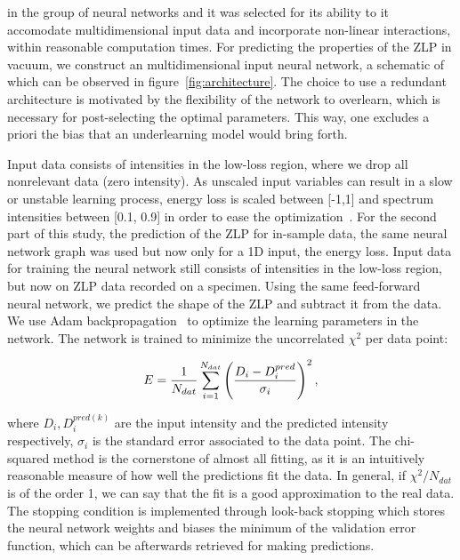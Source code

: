 %
%
in the group of neural networks and it was selected for its ability
to it accomodate multidimensional input data and 
incorporate non-linear interactions, within reasonable computation times. 
%
For predicting the properties of the ZLP in vacuum, we construct an multidimensional
input neural network, a schematic of which can be observed in figure~\ref{fig:architecture}.
%
The choice to use a redundant architecture is motivated by the flexibility of the network 
to overlearn, which is necessary for post-selecting the optimal parameters.
This way, one excludes a priori the bias that an underlearning model would bring forth. 



%
Input data consists of intensities in the low-loss region, 
where we drop all nonrelevant data (zero intensity). As unscaled input variables
can result in a slow or unstable learning process,
energy loss is scaled between [-1,1] and spectrum intensities between [0.1, 0.9]
in order to ease the optimization~\cite{Ball:2008by}.
%
For the second part of this study, the prediction of the ZLP for in-sample data,
the same neural network graph was used but now only for a 1D input, the energy loss. 
%
Input data for training the neural network still consists of intensities in the low-loss region, 
but now on ZLP data recorded on a specimen. Using the same feed-forward neural network,
we predict the shape of the ZLP and subtract it from the data.
%
We use Adam backpropagation~\cite{Kingma:2017} to optimize the learning parameters in the network. 
The network is trained to minimize the uncorrelated $\chi^2$ per data point:

\begin{equation}\label{eq:chi2}
\begin{centering}
    E = \frac{1}{N_{dat}}\sum_{i=1}^{N_{dat}}\left(\frac{D_i - D_i^{pred}}{\sigma_i}\right)^2, 
\end{centering}
\end{equation}

where $D_i, D_i^{pred(k)}$ are the input intensity and the predicted 
intensity respectively,
$\sigma_i$ is the standard error associated to the data point. 
%
The chi-squared method is the cornerstone of almost all fitting, as it is 
an intuitively reasonable measure of how well the predictions fit the data.
In general, if $\chi^2/N_{dat}$ is of the order 1, we can say that the fit is a 
good approximation to the real data. \\
%
The stopping condition is implemented through look-back stopping which stores 
the neural network weights and biases the minimum of the validation error function,  
which can be afterwards retrieved for 
making predictions.
%

